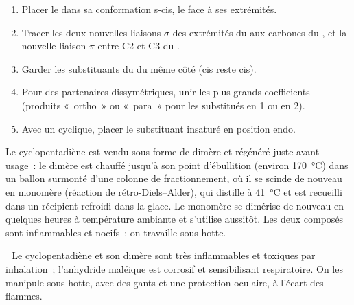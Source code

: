\begin{method}\label{met:b2:frontier-orbitals:diels-alder}
\begin{enumerate}
  \item Placer le  dans sa conformation s-cis, le  face à ses extrémités.
  \item Tracer les deux nouvelles liaisons $\sigma$ des extrémités du  aux carbones du ,
        et la nouvelle liaison $\pi$ entre C2 et C3 du .
  \item Garder les substituants du  du même côté (cis reste cis).
  \item Pour des partenaires dissymétriques, unir les plus grands coefficients (produits «~ortho~» ou «~para~»
        pour les  substitués en 1 ou en 2).
  \item Avec un  cyclique, placer le substituant insaturé en position endo.
\end{enumerate}
\end{method}

\begin{inthelab}
Le cyclopentadiène est vendu sous forme de dimère et régénéré juste avant usage~: le dimère est
chauffé jusqu'à son point d'ébullition (environ \qty{170}{\degreeCelsius}) dans un ballon surmonté d'une
colonne de fractionnement, où il se scinde de nouveau en monomère (réaction de rétro-Diels--Alder),
qui distille à \qty{41}{\degreeCelsius} et est recueilli dans un récipient refroidi
dans la glace. Le monomère se dimérise de nouveau en quelques heures à température ambiante et s'utilise
aussitôt. Les deux composés sont inflammables et nocifs~; on travaille sous hotte.
\end{inthelab}

\begin{safety}{\,\,}
Le cyclopentadiène et son dimère sont très inflammables et toxiques par inhalation~; l'anhydride
maléique est corrosif et sensibilisant respiratoire. On les manipule sous hotte,
avec des gants et une protection oculaire, à l'écart des flammes.
\end{safety}

